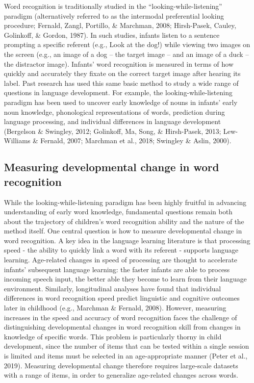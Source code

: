 \documentclass[
  english,
  man,floatsintext]{apa6}
\begin{document}
Word recognition is traditionally studied in the \enquote{looking-while-listening} paradigm (alternatively referred to as the intermodal preferential looking procedure; Fernald, Zangl, Portillo, \& Marchman, 2008; Hirsh-Pasek, Cauley, Golinkoff, \& Gordon, 1987).
In such studies, infants listen to a sentence prompting a specific referent (e.g., Look at the dog!) while viewing two images on the screen (e.g., an image of a dog -- the target image -- and an image of a duck -- the distractor image).
Infants' word recognition is measured in terms of how quickly and accurately they fixate on the correct target image after hearing its label.
Past research has used this same basic method to study a wide range of questions in language development.
For example, the looking-while-listening paradigm has been used to uncover early knowledge of nouns in infants' early noun knowledge, phonological representations of words, prediction during language processing, and individual differences in language development (Bergelson \& Swingley, 2012; Golinkoff, Ma, Song, \& Hirsh-Pasek, 2013; Lew-Williams \& Fernald, 2007; Marchman et al., 2018; Swingley \& Aslin, 2000).

\hypertarget{measuring-developmental-change-in-word-recognition}{%
\subsection{Measuring developmental change in word recognition}\label{measuring-developmental-change-in-word-recognition}}

While the looking-while-listening paradigm has been highly fruitful in advancing understanding of early word knowledge, fundamental questions remain both about the trajectory of children's word recognition ability and the nature of the method itself.
One central question is how to measure developmental change in word recognition.
A key idea in the language learning literature is that processing speed - the ability to quickly link a word with its referent - supports language learning.
Age-related changes in speed of processing are thought to accelerate infants' subsequent language learning: the faster infants are able to process incoming speech input, the better able they become to learn from their language environment.
Similarly, longitudinal analyses have found that individual differences in word recognition speed predict linguistic and cognitive outcomes later in childhood (e.g., Marchman \& Fernald, 2008).
However, measuring increases in the speed and accuracy of word recognition faces the challenge of distinguishing developmental changes in word recognition skill from changes in knowledge of specific words.
This problem is particularly thorny in child development, since the number of items that can be tested within a single session is limited and items must be selected in an age-appropriate manner (Peter et al., 2019).
Measuring developmental change therefore requires large-scale datasets with a range of items, in order to generalize age-related changes across words.
\end{document}
